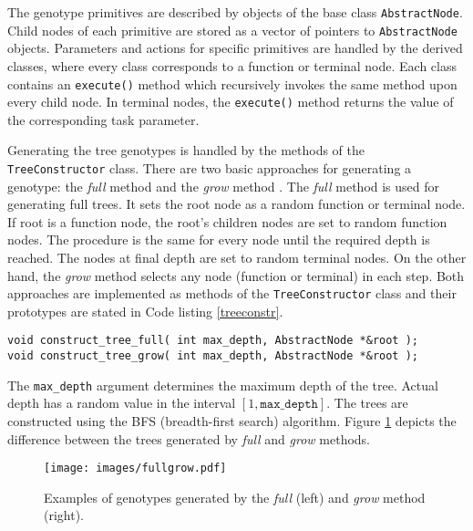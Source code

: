 The genotype primitives are described by objects of the base class \texttt{AbstractNode}.
Child nodes of each primitive are stored as a vector of pointers to \texttt{AbstractNode} objects.
Parameters and actions for specific primitives are handled by the derived classes, where every class corresponds to a function or terminal node.
Each class contains an \texttt{execute()} method which recursively invokes the same method upon every child node.
In terminal nodes, the \texttt{execute()} method returns the value of the corresponding task parameter.

Generating the tree genotypes is handled by the methods of the \texttt{TreeConstructor} class.
There are two basic approaches for generating a genotype: the \textit{full} method and the \textit{grow} method \cite{koza1992genetic}.
The \textit{full} method is used for generating full trees. 
It sets the root node as a random function or terminal node.
If root is a function node, the root's children nodes are set to random function nodes.
The procedure is the same for every node until the required depth is reached.
The nodes at final depth are set to random terminal nodes.
On the other hand, the \textit{grow} method selects any node (function or terminal) in each step.
Both approaches are implemented as methods of the \texttt{TreeConstructor} class and their prototypes are stated in Code listing \ref{treeconstr}.
\begin{lstlisting}[frame=none, label={treeconstr}, caption={Functions for implementing the \textit{full} and \textit{grow} methods for creating a genotype.}, captionpos=b]
void construct_tree_full( int max_depth, AbstractNode *&root );
void construct_tree_grow( int max_depth, AbstractNode *&root );
\end{lstlisting}
The \texttt{max\_depth} argument determines the maximum depth of the tree.
Actual depth has a random value in the interval $[1, \texttt{max\_depth}]$.
The trees are constructed using the BFS (breadth-first search) algorithm.
Figure \ref{fullgrow} depicts the difference between the trees generated by \textit{full} and \textit{grow} methods.
\begin{figure}[ht]
    \centering
    \texttt{[image: images/fullgrow.pdf]}
    \caption{Examples of genotypes generated by the \textit{full} (left) and \textit{grow} method (right).}
    \label{fullgrow}
\end{figure}


